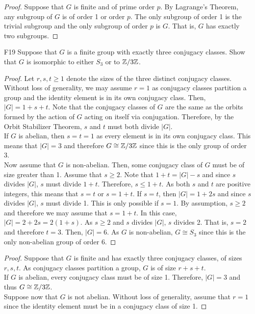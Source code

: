 \documentclass[../../AlgebraQualSolutions.tex]{subfiles}
\begin{document}
	\begin{proof}
	Suppose that $G$ is finite and of prime order $p$. By Lagrange's Theorem, any subgroup of $G$ is of order 1 or order $p$. The only subgroup of order 1 is the trivial subgroup and the only subgroup of order $p$ is $G$. That is, $G$ has exactly two subgroups.
	\end{proof}
	
	\begin{prob}{F19}{}
	Suppose that $G$ is a finite group with exactly three conjugacy classes. Show that $G$ is isomorphic to either $S_3$ or to $\mathbb{Z}/3\mathbb{Z}$.
	\end{prob}
	
	\begin{proof}
	Let $r,s,t \geq 1$ denote the sizes of the three distinct conjugacy classes. Without loss of generality, we may assume $r = 1$ as conjugacy classes partition a group and the identity element is in its own conjugacy class. Then, $|G| = 1 + s + t$. Note that the conjugacy classes of $G$ are the same as the orbits formed by the action of $G$ acting on itself via conjugation. Therefore, by the Orbit Stabilizer Theorem, $s$ and $t$ must both divide $|G|$.\\
	
	If $G$ is abelian, then $s = t =1$ as every element is in its own conjugacy class. This means that $|G| = 3$ and therefore $G \cong \mathbb{Z}/3\mathbb{Z}$ since this is the only group of order 3.\\
	
	Now assume that $G$ is non-abelian. Then, some conjugacy class of $G$ must be of size greater than 1. Assume that $s \geq 2$. Note that $1 + t = |G| -s$ and since $s$ divides $|G|$, $s$ must divide $1 + t$. Therefore, $s \leq 1 + t$. As both $s$ and $t$ are positive integers, this means that $s = t$ or $s = 1 + t$. If $s = t$, then $|G| = 1 + 2s$ and since $s$ divides $|G|$, $s$ must divide 1. This is only possible if $s = 1$. By assumption, $s \geq 2$ and therefore we may assume that $s = 1 + t$. In this case, $|G| = 2 + 2s = 2(1 + s)$. As $s \geq 2$ and $s$ divides $|G|$, $s$ divides 2. That is, $s = 2$ and therefore $t = 3$. Then, $|G| = 6$. As $G$ is non-abelian, $G \cong S_3$ since this is the only non-abelian group of order 6.
	\end{proof}
	
	\begin{proof}
	Suppose that $G$ is finite and has exactly three conjugacy classes, of sizes $r, s, t$. As conjugacy classes partition a group, $G$ is of size $r + s + t$.\\
	
	If $G$ is abelian, every conjugacy class must be of size 1. Therefore, $|G| = 3$ and thus $G \cong \mathbb{Z}/3\mathbb{Z}$.\\
	
	Suppose now that $G$ is not abelian. Without loss of generality, assume that $r = 1$ since the identity element must be in a conjugacy class of size 1. 
	\end{proof}
	
\end{document}
